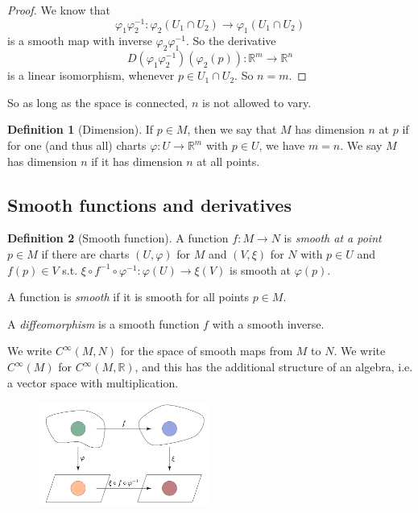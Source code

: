 \documentclass[a4paper,11pt]{article}
\theoremstyle{definition}
\newtheorem*{defn}{Definition}
\numberwithin{equation}{section}
\begin{document}
\begin{proof}
We know that
\[
\varphi_1\varphi_2^{-1}:\varphi_2(U_1\cap U_2)\rightarrow\varphi_1(U_1\cap U_2)
\]
is a smooth map with inverse $\varphi_2\varphi_1^{-1}$. So the derivative
\[
D(\varphi_1\varphi^{-1}_2)(\varphi_2(p)):\mathbb{R}^m\rightarrow\mathbb{R}^n
\]
is a linear isomorphism, whenever $p\in U_1\cap U_2$. So $n=m$.
\end{proof}

So as long as the space is connected, $n$ is not allowed to vary.

\begin{defn}[Dimension]
If $p\in M$, then we say that $M$ has dimension $n$ at $p$ if for one (and thus all) charts $\varphi:U\rightarrow\mathbb{R}^m$ with $p\in U$, we have $m=n$. We say $M$ has dimension $n$ if it has dimension $n$ at all points.
\end{defn}

\subsection{Smooth functions and derivatives}

\begin{defn}[Smooth function]
A function $f:M\rightarrow N$ is \emph{smooth at a point} $p\in M$ if there are charts $(U,\varphi)$ for $M$ and $(V,\xi)$ for $N$ with $p\in U$ and $f(p)\in V$ s.t. $\xi\circ f^{-1}\circ\varphi^{-1}:\varphi(U)\rightarrow\xi(V)$ is smooth at $\varphi(p)$.

A function is \emph{smooth} if it is smooth for all points $p\in M$.

A \emph{diffeomorphism} is a smooth function $f$ with a smooth inverse.
\end{defn}

We write $C^\infty(M,N)$ for the space of smooth maps from $M$ to $N$.  We write $C^\infty(M)$ for $C^\infty(M,\mathbb{R})$, and this has the additional structure of an algebra, i.e. a vector space with multiplication.

\begin{figure}[h]
    \centering
    \includegraphics[width=0.5\textwidth]{smooth.png}
\end{figure}
\end{document}
